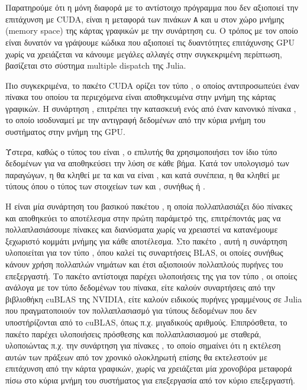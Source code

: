 Παρατηρούμε ότι η μόνη διαφορά με το αντίστοιχο πρόγραμμα που δεν αξιοποιεί την επιτάχυνση με CUDA, είναι η μεταφορά των πινάκων \texttt{A} και \texttt{u} στον χώρο μνήμης (memory space) της κάρτας γραφικών με την συνάρτηση \texttt{cu}.
Ο τρόπος με τον οποίο είναι δυνατόν να γράψουμε κώδικα που αξιοποιεί τις δυαντότητες επιτάχυνσης GPU χωρίς να χρειάζεται να κάνουμε μεγάλες αλλαγές στην συγκεκριμένη περίπτωση, βασίζεται στο σύστημα multiple dispatch της Julia.

Πιο συγκεκριμένα, το πακέτο CUDA ορίζει τον τύπο , ο οποίος αντιπροσωπεύει έναν πίνακα του οποίου τα περιεχόμενα είναι αποθηκευμένα στην μνήμη της κάρτας γραφικών.
Η συνάρτηση , επιτρέπει την κατασκευή ενός  από έναν κανονικό πίνακα , το οποίο ισοδυναμεί με την αντιγραφή δεδομένων από την κύρια μνήμη του συστήματος στην μνήμη της GPU.

Ύστερα, καθώς ο τύπος του  είναι , ο επιλυτής θα χρησιμοποιήσει τον ίδιο τύπο δεδομένων για να αποθηκεύσει την λύση σε κάθε βήμα.
Κατά τον υπολογισμό των παραγώγων, η  θα κληθεί με τα  και  να είναι , και κατά συνέπεια, η  θα κληθεί με τύπους  όπου  ο τύπος των στοιχείων των  και , συνήθως  ή .

Η  είναι μία συνάρτηση του βασικού πακέτου , η οποία πολλαπλασιάζει δύο πίνακες και αποθηκεύει το αποτέλεσμα στην πρώτη παράμετρό της, επιτρέποντάς μας να πολλαπλασιάσουμε πίνακες και διανύσματα χωρίς να χρειαστεί να κατανέμουμε ξεχωριστό κομμάτι μνήμης για κάθε αποτέλεσμα.
Στο πακέτο , αυτή η συνάρτηση υλοποιείται για τον τύπο , όπου καλεί τις συναρτήσεις BLAS, οι οποίες συνήθως κάνουν χρήση πολλαπλών νημάτων και έτσι αξιοποιούν πολλαπλούς πυρήνες του επεξεργαστή.
Το πακέτο  αντίστοιχα παρέχει υλοποιήσεις της  για τον τύπο , οι οποίες ανάλογα με τον τύπο δεδομένων του πίνακα, είτε καλούν συναρτήσεις από την βιβλιοθήκη cuBLAS της NVIDIA, είτε καλούν ειδικούς πυρήνες γραμμένους σε Julia που πραγματοποιούν τον πολλαπλασιασμό για τύπους δεδομένων που δεν υποστήρίζονται από το cuBLAS, όπως π.χ. μιγαδικούς αριθμούς.
Επιπρόσθετα, το πακέτο  παρέχει υλοποιήσεις πρόσθεσης και πολλαπλασιασμού με σταθερά, υλοποιώντας π.χ. την συνάρτηση  για πίνακες , το οποίο σημαίνει ότι η εκτέλεση αυτών των πράξεων από τον χρονικό ολοκληρωτή επίσης θα εκτελεστούν με επιτάχυνση από την κάρτα γραφικών, χωρίς να χρειάζεται μία χρονοβόρα μεταφορά πίσω στο κύρια μνήμη του συστήματος για επεξεργασία από τον κύριο επεξεργαστή.

